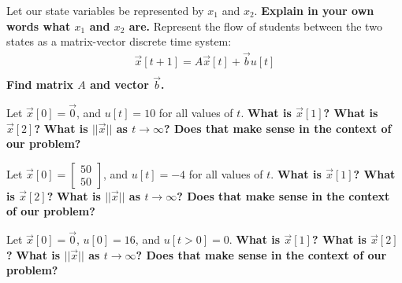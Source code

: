 \begin{enumerate}
    \qitem Let our state variables be represented by $x_1$ and $x_2$. \textbf{Explain in your own words what $x_1$ and $x_2$ are.}
        \sol{
        }
        \sol{
        }
        \sol{
        }
    \qitem Represent the flow of students between the two states as a matrix-vector discrete time system:
    \begin{align*}
        \vec{x}[t+1] =  A\vec{x}[t] + \vec{b}u[t]\\
    \end{align*}
    \textbf{Find matrix $A$ and vector $\vec{b}$.}
    \sol {
    }

    \qitem Let $\vec{x}[0] = \vec{0}$, and $u[t] = 10$ for all values of $t$. \textbf{What is $\vec{x}[1]$? What is $\vec{x}[2]$?} \textbf{What is $||\vec{x}||$ as $t\rightarrow\infty$? Does that make sense in the context of our problem?}
    

    \sol{
        
    }

    \qitem Let $\vec{x}[0] = \begin{bmatrix} 50 \\ 50 \end{bmatrix}$, and $u[t] = -4$ for all values of $t$. \textbf{What is $\vec{x}[1]$? What is $\vec{x}[2]$?} \textbf{What is $||\vec{x}||$ as $t\rightarrow\infty$? Does that make sense in the context of our problem?}

    \sol{

    }

    \qitem Let $\vec{x}[0] = \vec{0}$, $u[0] = 16$, and $u[t>0] = 0$. \textbf{What is $\vec{x}[1]$? What is $\vec{x}[2]$?} \textbf{What is $||\vec{x}||$ as $t\rightarrow\infty$? Does that make sense in the context of our problem?}

    \sol {

    }
\end{enumerate}